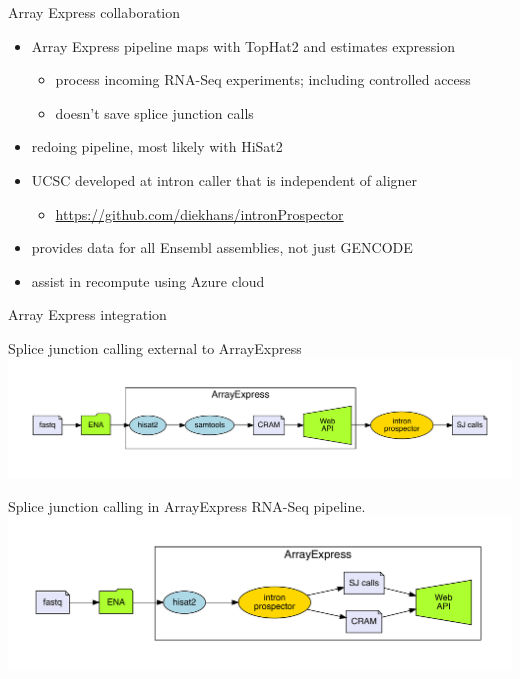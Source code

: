 \documentclass[10pt,
               hyperref={bookmarks=false,
                         bookmarksopen=false,
                         colorlinks=true,
                         linkcolor=blue,
                         urlcolor=blue},
               xcolor={svgnames,table}]{beamer}
\newenvironment{tightitemize}{%
\begin{itemize}
  \setlength{\itemsep}{1pt}%
  \setlength{\parskip}{0pt}%
  \setlength{\parsep}{0pt}%
}{\end{itemize}}
\begin{document}
\begin{frame}{Array Express collaboration}
  \begin{itemize}
  \item Array Express pipeline maps with TopHat2 and estimates expression
    \begin{tightitemize}
    \item process incoming RNA-Seq experiments; including controlled access
    \item doesn't save splice junction calls
    \end{tightitemize}
  \item redoing pipeline, most likely with HiSat2
  \item UCSC developed at intron caller that is independent of aligner
    \begin{tightitemize}
    \item \url{https://github.com/diekhans/intronProspector}
    \end{tightitemize}
  \item provides data for all Ensembl assemblies, not just GENCODE
  \item assist in recompute using Azure cloud
  \end{itemize}
\end{frame}

\begin{frame}{Array Express integration}
  \begin{center}
    Splice junction calling external to ArrayExpress
    \includegraphics[scale=0.42]{images/calling_external.pdf}

    Splice junction calling in ArrayExpress RNA-Seq pipeline.
    \includegraphics[scale=0.42]{images/calling_at_array_express.pdf}
  \end{center}
\end{frame}
\end{document}
